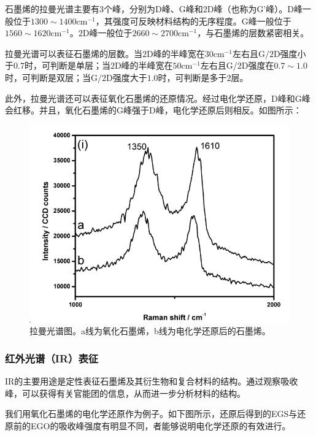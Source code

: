 石墨烯的拉曼光谱主要有$3$个峰，分别为D峰、G峰和$2$D峰（也称为G'峰）。D峰一般位于$1300\sim 1400\mathrm{cm}^{-1}$，其强度可反映材料结构的无序程度\cite{Tuinstra1970}。G峰一般位于$1560\sim 1620\mathrm{cm}^{-1}$。$2$D峰一般位于$2660\sim 2700\mathrm{cm}^{-1}$，与石墨烯的层数紧密相关\cite{Ferrari2006}。

拉曼光谱可以表征石墨烯的层数。当$2$D峰的半峰宽在$30\mathrm{cm}^{-1}$左右且G/$2$D强度小于$0.7$时，可判断是单层；当$2$D峰的半峰宽在$50\mathrm{cm}^{-1}$左右且G/$2$D强度在$0.7\sim 1.0$时，可判断是双层；当G/$2$D强度大于$1.0$时，可判断是多于$2$层\cite{Kahng2010}。

此外，拉曼光谱还可以表征氧化石墨烯的还原情况。经过电化学还原，D峰和G峰会红移。并且，氧化石墨烯的G峰强于D峰，电化学还原后则相反\cite{Ramesha2009}。如图所示：

\begin{figure}
    \centering
    \includegraphics[scale=0.7]{img/Raman}
    \caption{拉曼光谱图。a线为氧化石墨烯，b线为电化学还原后的石墨烯。}
\end{figure}


\subsubsection{红外光谱（IR）表征}

IR的主要用途是定性表征石墨烯及其衍生物和复合材料的结构。通过观察吸收峰，可以获得有关官能团的信息，从而进一步分析材料的结构。

我们用氧化石墨烯的电化学还原作为例子。如下图所示，还原后得到的EGS与还原前的EGO的吸收峰强度有明显不同，者能够说明电化学还原的有效进行\cite{Liu2010}。

